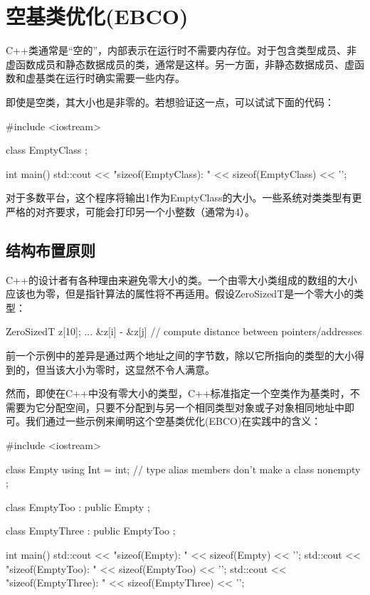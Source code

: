 \section{空基类优化(EBCO)}

C++类通常是“空的”，内部表示在运行时不需要内存位。对于包含类型成员、非虚函数成员和静态数据成员的类，通常是这样。另一方面，非静态数据成员、虚函数和虚基类在运行时确实需要一些内存。

即使是空类，其大小也是非零的。若想验证这一点，可以试试下面的代码：

\begin{cpp}
#include <iostream>

class EmptyClass {};

int main() {
	std::cout << "sizeof(EmptyClass): " << sizeof(EmptyClass) << '\n';
}
\end{cpp}

对于多数平台，这个程序将输出1作为EmptyClass的大小。一些系统对类类型有更严格的对齐要求，可能会打印另一个小整数（通常为4）。

\subsection{结构布置原则}

C++的设计者有各种理由来避免零大小的类。一个由零大小类组成的数组的大小应该也为零，但是指针算法的属性将不再适用。假设ZeroSizedT是一个零大小的类型：

\begin{cpp}
ZeroSizedT z[10];
...
&z[i] - &z[j] // compute distance between pointers/addresses
\end{cpp}

前一个示例中的差异是通过两个地址之间的字节数，除以它所指向的类型的大小得到的，但当该大小为零时，这显然不令人满意。

然而，即使在C++中没有零大小的类型，C++标准指定一个空类作为基类时，不需要为它分配空间，只要不分配到与另一个相同类型对象或子对象相同地址中即可。我们通过一些示例来阐明这个空基类优化(EBCO)在实践中的含义：

\begin{cpp}
#include <iostream>

class Empty {
	using Int = int; // type alias members don't make a class nonempty
};

class EmptyToo : public Empty {};

class EmptyThree : public EmptyToo {};

int main() {
	std::cout << "sizeof(Empty): " << sizeof(Empty) << '\n';
	std::cout << "sizeof(EmptyToo): " << sizeof(EmptyToo) << '\n';
	std::cout << "sizeof(EmptyThree): " << sizeof(EmptyThree) << '\n';
}
\end{cpp}

